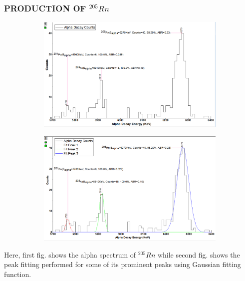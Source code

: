 \documentclass[12pt]{article}
\begin{document}
\subsubsection{PRODUCTION OF $^{205}Rn$}
\begin{figure}[h]
\centering
 \begin{subfigure}
\centering
\includegraphics[scale=0.5]{Rn205.png}
\end{subfigure}
\hfill
\begin{subfigure}
\centering
\includegraphics[scale=0.5]{Rn205(Peak Fitting).png}
\end{subfigure}
\label{First fig shows the alpha spectrum of Rn 205 and second fig shows the peak fitting for its prominent peaks.}
\end{figure}
Here, first fig. shows the alpha spectrum of $^{205}Rn$ while second fig. shows the peak fitting performed for some of its prominent peaks using Gaussian fitting function.
\clearpage
\end{document}
